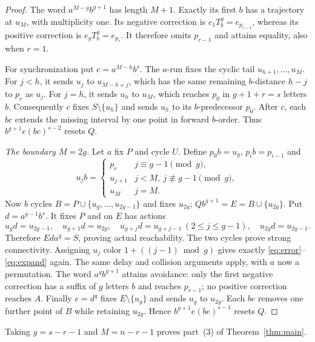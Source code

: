 \documentclass[10pt]{article}
\begin{document}
\begin{proof}
The word $a^{M-g}b^{g+1}$ has length $M+1$.
Exactly its first $b$ has a trajectory at $u_M$, with multiplicity one.
Its negative correction is $e_1T_b^g=e_{p_{r-1}}$, whereas
its positive correction is $e_gT_b^g=e_{p_r}$.
It therefore omits $p_{r-1}$ and attains equality, also when $r=1$.

For synchronization put $c=a^{M-h}b^s$.
The $a$-run fixes the cyclic tail $u_{h+1},\ldots,u_M$.
For $j<h$, it sends $u_j$ to $u_{M-h+j}$, which has the same remaining
$b$-distance $h-j$ to $p_r$ as $u_j$.
For $j=h$, it sends $u_h$ to $u_M$, which reaches $p_0$ in $g+1+r=s$ letters $b$.
Consequently $c$ fixes $S\setminus\{u_h\}$ and sends $u_h$ to its $b$-predecessor $p_0$.
After $c$, each $bc$ extends the missing interval by one point in forward
$b$-order. Thus $b^{g+1}c(bc)^{s-2}$ resets $Q$.

\emph{The boundary $M=2g$.}
Let $a$ fix $P$ and cycle $U$.
Define $p_0b=u_g$, $p_ib=p_{i-1}$ and
\[
 u_jb=\begin{cases}
 p_r&j\equiv g-1\pmod g,\\
 u_{j+1}&j<M,\ j\not\equiv g-1\pmod g,\\
 u_M&j=M.
 \end{cases}
\]
Now $b$ cycles $B=P\cup\{u_g,\ldots,u_{2g-1}\}$ and fixes $u_{2g}$;
$Qb^{g+1}=E=B\cup\{u_{2g}\}$.
Put $d=a^{g-1}b^s$. It fixes $P$ and on $E$ has actions
\[
 u_gd=u_{2g-1},\quad u_{g+1}d=u_{2g},\quad
 u_{g+j}d=u_{g+j-1}\ (2\le j\le g-1),\quad u_{2g}d=u_{2g-1}.
\]
Therefore $Eda^g=S$, proving actual reachability. The two cycles prove strong connectivity.
Assigning $u_j$ color $1+((j-1)\bmod g)$ gives exactly
\eqref{eq:error}--\eqref{eq:expand} again.
The same delay and collision arguments apply, with $a$ now a permutation.
The word $a^gb^{g+1}$ attains avoidance: only the first negative correction
has a suffix of $g$ letters $b$ and reaches $p_{r-1}$; no positive correction reaches $A$.
Finally $e=d^g$ fixes $E\setminus\{u_g\}$ and sends $u_g$ to $u_{2g}$.
Each $be$ removes one further point of $B$ while retaining $u_{2g}$.
Hence $b^{g+1}e(be)^{s-1}$ resets $Q$.
\end{proof}
Taking $g=s-r-1$ and $M=n-r-1$ proves part~(3) of Theorem~\ref{thm:main}.
\end{document}

